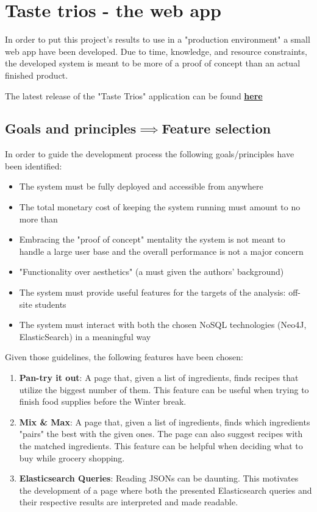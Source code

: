 \section{Taste trios - the web app}
In order to put this project's results to use in a "production environment" a small web app have been developed. Due to time, knowledge, and resource constraints, the developed system is meant to be more of a proof of concept than an actual finished product.

The latest release of the "Taste Trios" application can be found \textbf{\href{https://taste-trios-front-end.vercel.app/}{here}}

\subsection{Goals and principles$\implies$Feature selection}
In order to guide the development process the following goals/principles have been identified:
\begin{itemize}
    \item The system must be fully deployed and accessible from anywhere
    \item The total monetary cost of keeping the system running must amount to no more than 
    \item Embracing the "proof of concept" mentality the system is not meant to handle a large user base and the overall performance is not a major concern
    \item "Functionality over aesthetics" (a must given the authors' background)
    \item The system must provide useful features for the targets of the analysis: off-site students
    \item The system must interact with both the chosen NoSQL technologies (Neo4J, ElasticSearch) in a meaningful way
\end{itemize}

Given those guidelines, the following features have been chosen:
\begin{enumerate}
    \item \textbf{Pan-try it out}: A page that, given a list of ingredients, finds recipes that utilize the biggest number of them. This feature can be useful when trying to finish food supplies before the Winter break.
    \item \textbf{Mix \& Max}: A page that, given a list of ingredients, finds which ingredients "pairs" the best with the given ones. The page can also suggest recipes with the matched ingredients. This feature can be helpful when deciding what to buy while grocery shopping.
    \item \textbf{Elasticsearch Queries}: Reading JSONs can be daunting. This motivates the development of a page where both the presented Elasticsearch queries and their respective results are interpreted and made readable.
\end{enumerate}


